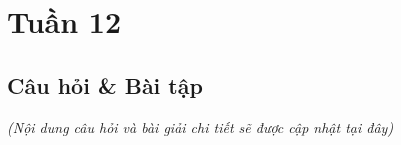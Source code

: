 \section{Tuần 12}
\label{sec:week12}

\subsection{Câu hỏi \& Bài tập}
\textit{(Nội dung câu hỏi và bài giải chi tiết sẽ được cập nhật tại đây)}
